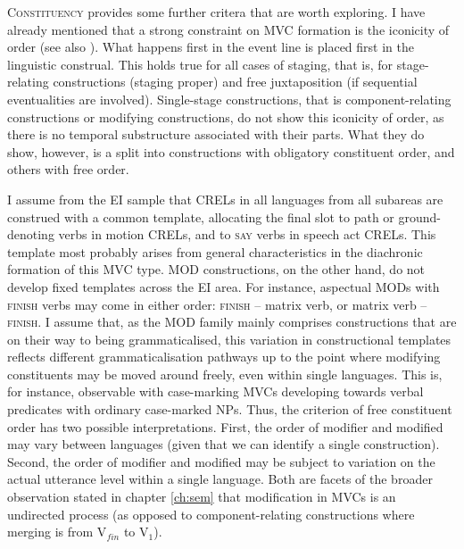 \textsc{Constituency} provides some further critera that are worth exploring. I have already mentioned that a strong constraint on MVC formation is the iconicity of order (see also \citealt{vanstaden2008serial}). What happens first in the event line is placed first in the linguistic construal. This holds true for all cases of staging, that is, for stage-relating constructions (staging proper) and free juxtaposition (if sequential eventualities are involved). Single-stage constructions, that is component-relating constructions or modifying constructions, do not show this iconicity of order, as there is no temporal substructure associated with their parts. What they do show, however, is a split into constructions with obligatory constituent order, and others with free order. 

I assume from the EI sample that CRELs in all languages from all subareas are construed with a common template, allocating the final slot to path or ground-denoting verbs in motion CRELs, and to \textsc{say} verbs in speech act CRELs. This template most probably arises from general characteristics in the diachronic formation of this MVC type. MOD constructions, on the other hand, do not develop fixed templates across the EI area. For instance, aspectual MODs with \textsc{finish} verbs may come in either order: \textsc{finish} -- matrix verb, or matrix verb -- \textsc{finish}. I assume that, as the MOD family mainly comprises constructions that are on their way to being grammaticalised, this variation in constructional templates reflects different grammaticalisation pathways up to the point where modifying constituents may be moved around freely, even within single languages. This is, for instance, observable with case-marking MVCs developing towards verbal predicates with ordinary case-marked NPs. Thus, the criterion of free constituent order has two possible interpretations. First, the order of modifier and modified may vary between languages (given that we can identify a single construction). Second, the order of modifier and modified may be subject to variation on the actual utterance level within a single language. Both are facets of the broader observation stated in chapter \ref{ch:sem} that modification in MVCs is an undirected process (as opposed to component-relating constructions where merging is from V$_{fin}$ to V$_1$).

